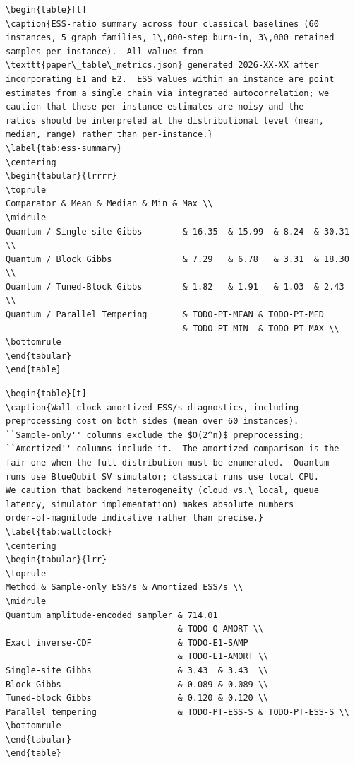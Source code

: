 \begin{verbatim}
\begin{table}[t]
\caption{ESS-ratio summary across four classical baselines (60
instances, 5 graph families, 1\,000-step burn-in, 3\,000 retained
samples per instance).  All values from
\texttt{paper\_table\_metrics.json} generated 2026-XX-XX after
incorporating E1 and E2.  ESS values within an instance are point
estimates from a single chain via integrated autocorrelation; we
caution that these per-instance estimates are noisy and the
ratios should be interpreted at the distributional level (mean,
median, range) rather than per-instance.}
\label{tab:ess-summary}
\centering
\begin{tabular}{lrrrr}
\toprule
Comparator & Mean & Median & Min & Max \\
\midrule
Quantum / Single-site Gibbs        & 16.35  & 15.99  & 8.24  & 30.31 \\
Quantum / Block Gibbs              & 7.29   & 6.78   & 3.31  & 18.30 \\
Quantum / Tuned-Block Gibbs        & 1.82   & 1.91   & 1.03  & 2.43  \\
Quantum / Parallel Tempering       & TODO-PT-MEAN & TODO-PT-MED
                                   & TODO-PT-MIN  & TODO-PT-MAX \\
\bottomrule
\end{tabular}
\end{table}
\end{verbatim}

\begin{verbatim}
\begin{table}[t]
\caption{Wall-clock-amortized ESS/s diagnostics, including
preprocessing cost on both sides (mean over 60 instances).
``Sample-only'' columns exclude the $O(2^n)$ preprocessing;
``Amortized'' columns include it.  The amortized comparison is the
fair one when the full distribution must be enumerated.  Quantum
runs use BlueQubit SV simulator; classical runs use local CPU.
We caution that backend heterogeneity (cloud vs.\ local, queue
latency, simulator implementation) makes absolute numbers
order-of-magnitude indicative rather than precise.}
\label{tab:wallclock}
\centering
\begin{tabular}{lrr}
\toprule
Method & Sample-only ESS/s & Amortized ESS/s \\
\midrule
Quantum amplitude-encoded sampler & 714.01
                                  & TODO-Q-AMORT \\
Exact inverse-CDF                 & TODO-E1-SAMP
                                  & TODO-E1-AMORT \\
Single-site Gibbs                 & 3.43  & 3.43  \\
Block Gibbs                       & 0.089 & 0.089 \\
Tuned-block Gibbs                 & 0.120 & 0.120 \\
Parallel tempering                & TODO-PT-ESS-S & TODO-PT-ESS-S \\
\bottomrule
\end{tabular}
\end{table}
\end{verbatim}

